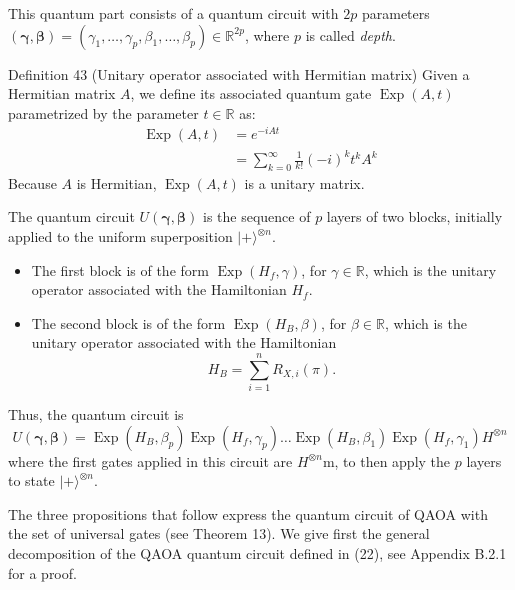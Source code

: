 This quantum part consists of a quantum circuit with $2 p$ parameters $(\boldsymbol{\gamma}, \boldsymbol{\beta})=\left(\gamma_{1}, \ldots, \gamma_{p}, \beta_{1}, \ldots, \beta_{p}\right) \in \mathbb{R}^{2 p}$, where $p$ is called \textit{depth}. 

\begin{definition}
    Definition 43 (Unitary operator associated with Hermitian matrix) Given a Hermitian matrix $A$, we define its associated quantum gate $\operatorname{Exp}(A, t)$ parametrized by the parameter $t \in \mathbb{R}$ as:
$$
\begin{aligned}
\operatorname{Exp}(A, t) & =e^{-i A t} \\
& =\sum_{k=0}^{\infty} \frac{1}{k!}(-i)^{k} t^{k} A^{k}
\end{aligned}
$$
Because $A$ is Hermitian, $\operatorname{Exp}(A, t)$ is a unitary matrix.
\end{definition}

The quantum circuit $U(\boldsymbol{\gamma}, \boldsymbol{\beta})$ is the sequence of $p$ layers of two blocks, initially applied to the uniform superposition $|+\rangle^{\otimes n}$. %
\begin{itemize}
    \item The first block is of the form $\operatorname{Exp}\left(H_{f}, \gamma\right)$, for $\gamma \in \mathbb{R}$, which is the unitary operator associated with the Hamiltonian $H_{f}$.
    \item The second block is of the form $\operatorname{Exp}\left(H_{B}, \beta\right)$, for $\beta \in \mathbb{R}$, which is the unitary operator associated with the Hamiltonian
    $$
    H_{B}=\sum_{i=1}^{n} R_{X, i}(\pi).
    $$
\end{itemize}
Thus, the quantum circuit is
\begin{equation*}
U(\boldsymbol{\gamma}, \boldsymbol{\beta})=\operatorname{Exp}\left(H_{B}, \beta_{p}\right) \operatorname{Exp}\left(H_{f}, \gamma_{p}\right) \ldots \operatorname{Exp}\left(H_{B}, \beta_{1}\right) \operatorname{Exp}\left(H_{f}, \gamma_{1}\right) H^{\otimes n} \tag{22}
\end{equation*}
where the first gates applied in this circuit are $H^{\otimes n}$m, to then apply the $p$ layers to state $|+\rangle^{\otimes n}$. 

The three propositions that follow express the quantum circuit of QAOA with the set of universal gates (see Theorem 13). We give first the general decomposition of the QAOA quantum circuit defined in (22), see Appendix B.2.1 for a proof.

